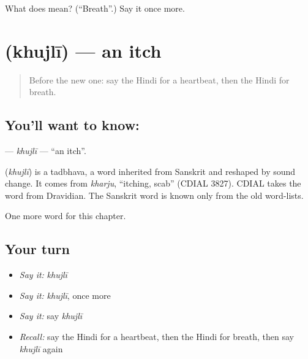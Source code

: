 \begin{tcolorbox}[breakable,colback=teal!4,colframe=teal!35!black,title={Before you move on}]
What does  mean? (\textquotedblleft{}Breath\textquotedblright{}.) Say it once more.
\end{tcolorbox}
\section[\texorpdfstring{\hi{खुजली} (khujlī)}{खुजली (khujlī)}]{ (khujlī) — an itch}

\label{lesson:HI-C274-khujli}



\begin{quote}
Before the new one: say the Hindi for a heartbeat, then the Hindi for breath.
\end{quote}

\subsection*{You'll want to know: }
\textbf{} — \emph{khujlī} — \textquotedblleft{}an itch\textquotedblright{}.

\begin{cousinweb}
\textbf{} (\emph{khujlī}) is a tadbhava, a word inherited from Sanskrit and reshaped by sound change. It comes from \emph{kharju}, \textquotedblleft{}itching, scab\textquotedblright{} (CDIAL 3827). CDIAL takes the word from Dravidian. The Sanskrit word is known only from the old word-lists.
\end{cousinweb}

\begin{grammarlens}[title={What you've built}]
One more word for this chapter.
\end{grammarlens}

\subsection*{Your turn}
\begin{itemize}
\raggedright
  \item \emph{Say it:} \emph{khujlī}
  \item \emph{Say it:} \emph{khujlī}, once more
  \item \emph{Say it:} say \emph{khujlī}
  \item \emph{Recall:} say the Hindi for a heartbeat, then the Hindi for breath, then say \emph{khujlī} again
\end{itemize}

